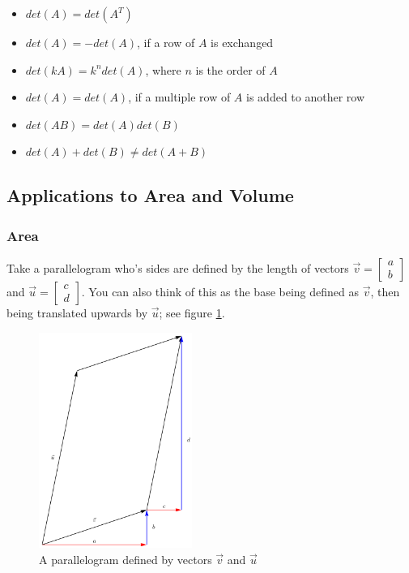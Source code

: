 \documentclass[12pt]{article}
\begin{document}
{\begin{itemize}
    \item $det(A) = det(A^T)$
    \item $det(A) = -det(A)$, if a row of $A$ is exchanged
    \item $det(kA) = k^n det(A)$, where $n$ is the order of $A$
    \item $det(A) = det(A)$, if a multiple row of $A$ is added to another row
    \item $det(AB) = det(A)det(B)$
    \item $det(A) + det(B) \neq det(A+B)$
\end{itemize}

\subsection{Applications to Area and Volume}

\subsubsection{Area}

Take a parallelogram who's sides are defined by the length of vectors $\vec{v} = \begin{bmatrix}
    a\\
    b
\end{bmatrix}$ and $\vec{u} = \begin{bmatrix}
    c\\
    d
\end{bmatrix}$. You can also think of this as the base being defined as $\vec{v}$, then being translated upwards by $\vec{u}$; see figure \ref{fig:parallelogram}.

\begin{figure}
    \centering
    \includegraphics[width=5cm]{misc/parallelogram.png}
    \caption{A parallelogram defined by vectors $\vec{v}$ and $\vec{u}$}
    \label{fig:parallelogram}
\end{figure}

}
\end{document}
